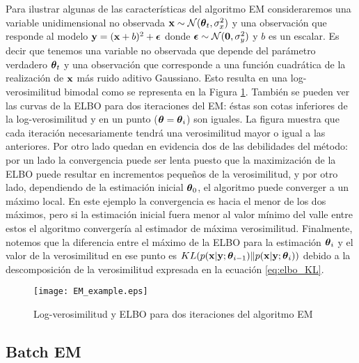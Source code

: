 Para ilustrar algunas de las características del algoritmo EM consideraremos una variable unidimensional no observada $\mathbf{x} \sim \mathcal{N}(\mbox{\boldmath$ \theta $}_t, \sigma_x^2)$ y una observación que responde al modelo $\mathbf{y} = (\mathbf{x} + b)^2 + \mbox{\boldmath$ \epsilon $}$ donde $\mbox{\boldmath$ \epsilon $} \sim \mathcal{N}(\mathbf{0}, \sigma_y^2)$ y $b$ es un escalar. Es decir que tenemos una variable no observada que depende del parámetro verdadero $\mbox{\boldmath$ \theta $}_t$ y una observación que corresponde a una función cuadrática de la realización de $\mathbf{x}$ más ruido aditivo Gaussiano. Esto resulta en una log-verosimilitud bimodal como se representa en la Figura \ref{fig:EM_example}. También se pueden ver las curvas de la ELBO para dos iteraciones del EM: éstas son cotas inferiores de la log-verosimilitud y en un punto ($\mbox{\boldmath$ \theta $} = \mbox{\boldmath$ \theta $}_i$) son iguales. La figura muestra que cada iteración necesariamente tendrá una verosimilitud mayor o igual a las anteriores. Por otro lado quedan en evidencia dos de las debilidades del método: por un lado la convergencia puede ser lenta  puesto que la maximización de la ELBO puede resultar en incrementos pequeños de la verosimilitud, y por otro lado, dependiendo de la estimación inicial $\mbox{\boldmath$ \theta $}_0$, el algoritmo puede converger a un máximo local. En este ejemplo la convergencia es hacia el menor de los dos máximos, pero si la estimación inicial fuera menor al valor mínimo del valle entre estos el algoritmo convergería al estimador de máxima verosimilitud. Finalmente, notemos que la diferencia entre el máximo de la ELBO para la estimación $\mbox{\boldmath$ \theta $}_i$ y el valor de la verosimilitud en ese punto es $KL(p(\mathbf{x} | \mathbf{y}; \mbox{\boldmath$ \theta $}_{i-1}) \rVert p(\mathbf{x} | \mathbf{y}; \mbox{\boldmath$ \theta $}_{i}))$ debido a la descomposición de la verosimilitud expresada en la ecuación \ref{eq:elbo_KL}.

\begin{figure}[h]
    \centering
    \texttt{[image: EM\_example.eps]}
    \caption{Log-verosimilitud y ELBO para dos iteraciones del algoritmo EM}
    \label{fig:EM_example}
\end{figure}

\subsection{Batch EM} \label{sec:batchEM}

